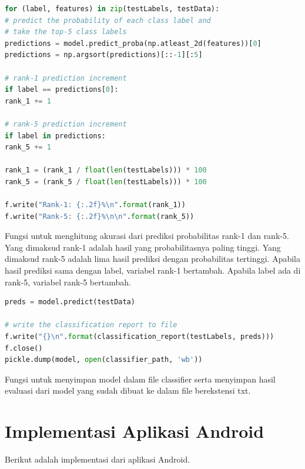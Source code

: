 \begin{lstlisting}[language=python, caption=Melakukan Prediksi Probabilitas, label=code:predict_proba, firstnumber=74]
for (label, features) in zip(testLabels, testData):
# predict the probability of each class label and
# take the top-5 class labels
predictions = model.predict_proba(np.atleast_2d(features))[0]
predictions = np.argsort(predictions)[::-1][:5]

# rank-1 prediction increment
if label == predictions[0]:
rank_1 += 1

# rank-5 prediction increment
if label in predictions:
rank_5 += 1

rank_1 = (rank_1 / float(len(testLabels))) * 100
rank_5 = (rank_5 / float(len(testLabels))) * 100

f.write("Rank-1: {:.2f}%\n".format(rank_1))
f.write("Rank-5: {:.2f}%\n\n".format(rank_5))

\end{lstlisting}
\par Fungsi untuk menghitung akurasi dari prediksi probabilitas rank-1 dan rank-5. Yang dimaksud rank-1 adalah hasil yang probabilitasnya paling tinggi. Yang dimaksud rank-5 adalah lima hasil prediksi dengan probabilitas tertinggi. Apabila hasil prediksi sama dengan label, variabel rank-1 bertambah. Apabila label ada di rank-5, variabel rank-5 bertambah.

\begin{lstlisting}[language=python, caption=Menyimpan model dan hasil, label=code:save_model, firstnumber=105]
preds = model.predict(testData)

# write the classification report to file
f.write("{}\n".format(classification_report(testLabels, preds)))
f.close()
pickle.dump(model, open(classifier_path, 'wb'))

\end{lstlisting}
\par Fungsi untuk menyimpan model dalam file classifier serta menyimpan hasil evaluasi dari model yang sudah dibuat ke dalam file berekstensi txt. 

\section{Implementasi Aplikasi Android}
\par Berikut adalah implementasi dari aplikasi Android. 
